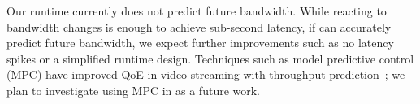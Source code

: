  Our runtime currently does not predict
future bandwidth. While reacting to bandwidth changes is enough to achieve
sub-second latency, if \sysname{} can accurately predict future bandwidth, we
expect further improvements such as no latency spikes or a simplified runtime
design. Techniques such as model predictive control (MPC) have improved QoE in
video streaming with throughput prediction~\cite{yin2015control}; we plan to
investigate using MPC in \sysname{} as a future work.

